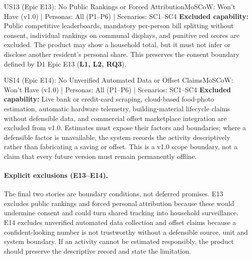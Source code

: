 \documentclass[12pt,a4paper]{article}
\begin{document}
\begin{storybox}{US13 (Epic E13): No Public Rankings or Forced Attribution}{MoSCoW: Won't Have (v1.0) | Personas: All (P1--P6) | Scenarios: SC1--SC4}
\textbf{Excluded capability:} Public competitive leaderboards, mandatory per-person bill splitting without consent, individual rankings on communal displays, and punitive red scores are excluded. The product may show a household total, but it must not infer or disclose another resident's personal share. This preserves the consent boundary defined by D1 Epic E13 (\textbf{L1, L2, RQ3}).
\end{storybox}

\begin{storybox}{US14 (Epic E14): No Unverified Automated Data or Offset Claims}{MoSCoW: Won't Have (v1.0) | Personas: All (P1--P6) | Scenarios: SC1--SC4}
\textbf{Excluded capability:} Live bank or credit-card scraping, cloud-based food-photo estimation, automatic hardware telemetry, building-material lifecycle claims without defensible data, and commercial offset marketplace integration are excluded from v1.0. Estimates must expose their factors and boundaries; where a defensible factor is unavailable, the system records the activity descriptively rather than fabricating a saving or offset. This is a v1.0 scope boundary, not a claim that every future version must remain permanently offline.
\end{storybox}

\paragraph{Explicit exclusions (E13--E14).}
The final two stories are boundary conditions, not deferred promises. E13 excludes public rankings and forced personal attribution because these would undermine consent and could turn shared tracking into household surveillance. E14 excludes unverified automated data collection and offset claims because a confident-looking number is not trustworthy without a defensible source, unit and system boundary. If an activity cannot be estimated responsibly, the product should preserve the descriptive record and state the limitation.

\clearpage

\end{document}
